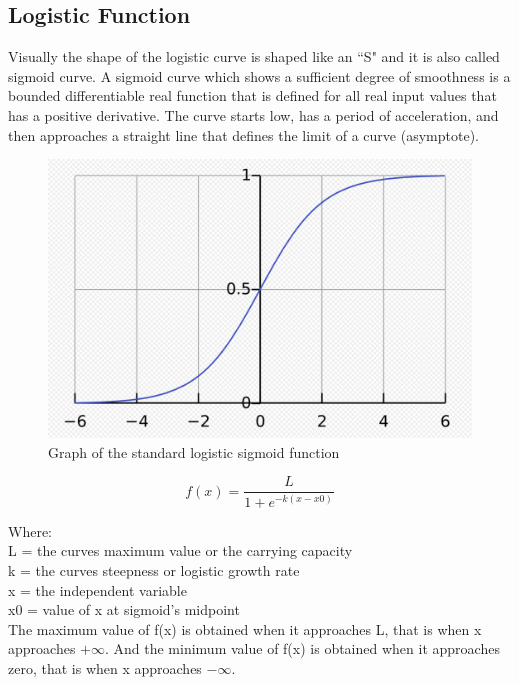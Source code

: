 \documentclass[conference]{IEEEtran}
\begin{document}
\subsection{Logistic Function}
Visually the shape of the logistic curve is shaped like an “S" and it is also called sigmoid curve.
A sigmoid curve which shows a sufficient degree of smoothness is a bounded differentiable real function that is defined for all real input values that has a positive derivative. \cite{bb7} The curve starts low, has a period of acceleration, and then approaches a straight line that defines the limit of a curve (asymptote).

\begin{figure}[h]
    \centering
    \includegraphics[scale=0.24]{figs/Lfunction.png}
    \caption{Graph of the standard logistic sigmoid function \cite{img}}
    \label{dabc}        
\end{figure}

\begin{equation} 
\label{equ2}
f(x) = \frac{L}{1 + e{^{-k(x-x0)}}}
\end{equation} 


Where:\\
L = the curves maximum value or the carrying capacity\\
k = the curves steepness or logistic growth rate\\
x = the independent variable\\
x0 = value of x at sigmoid’s midpoint\\

The maximum value of f(x) is obtained when it approaches L, that is when x approaches $+\infty$. And the minimum value of f(x) is obtained when it approaches zero, that is when x approaches $-\infty$.
\end{document}
